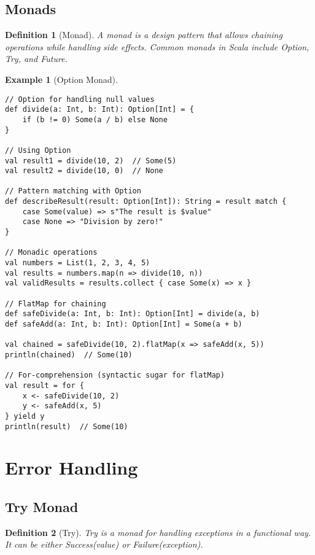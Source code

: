 \documentclass[11pt]{article}
\newtheorem{definition}{Definition}[section]
\newtheorem{example}{Example}[section]
\begin{document}
\subsection{Monads}

\begin{definition}[Monad]
A monad is a design pattern that allows chaining operations while handling side effects. Common monads in Scala include Option, Try, and Future.
\end{definition}

\begin{example}[Option Monad]
\begin{lstlisting}
// Option for handling null values
def divide(a: Int, b: Int): Option[Int] = {
    if (b != 0) Some(a / b) else None
}

// Using Option
val result1 = divide(10, 2)  // Some(5)
val result2 = divide(10, 0)  // None

// Pattern matching with Option
def describeResult(result: Option[Int]): String = result match {
    case Some(value) => s"The result is $value"
    case None => "Division by zero!"
}

// Monadic operations
val numbers = List(1, 2, 3, 4, 5)
val results = numbers.map(n => divide(10, n))
val validResults = results.collect { case Some(x) => x }

// FlatMap for chaining
def safeDivide(a: Int, b: Int): Option[Int] = divide(a, b)
def safeAdd(a: Int, b: Int): Option[Int] = Some(a + b)

val chained = safeDivide(10, 2).flatMap(x => safeAdd(x, 5))
println(chained)  // Some(10)

// For-comprehension (syntactic sugar for flatMap)
val result = for {
    x <- safeDivide(10, 2)
    y <- safeAdd(x, 5)
} yield y
println(result)  // Some(10)
\end{lstlisting}
\end{example}

\section{Error Handling}

\subsection{Try Monad}

\begin{definition}[Try]
Try is a monad for handling exceptions in a functional way. It can be either Success(value) or Failure(exception).
\end{definition}
\end{document}
